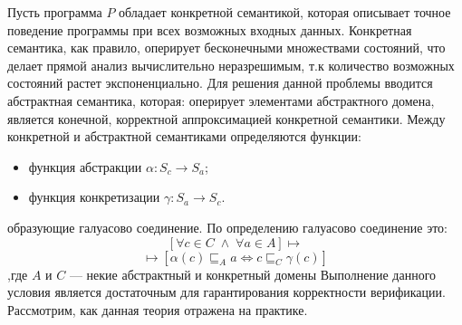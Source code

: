 Пусть программа $P$ обладает конкретной семантикой, которая описывает точное поведение программы при всех возможных 
входных данных. Конкретная семантика, как правило, оперирует бесконечными множествами состояний, что делает прямой анализ вычислительно неразрешимым, т.к 
количество возможных состояний растет экспоненциально. Для решения данной проблемы вводится абстрактная семантика, которая:
оперирует элементами абстрактного домена, является конечной, корректной аппроксимацией конкретной семантики.
Между конкретной и абстрактной семантиками определяются функции:
\begin{itemize}
    \item функция абстракции $\alpha : S_c \rightarrow S_a$;
    \item функция конкретизации $\gamma : S_a \rightarrow S_c$.
\end{itemize}
образующие галуасово соединение. По определению галуасово соединение это:
$$[\forall c\in C \;\land\; \forall a \in A] \longmapsto $$
$$ \longmapsto [\alpha(c) \sqsubseteq_A a \Longleftrightarrow c \sqsubseteq_C \gamma(c)] $$
,где $A$ и $C$ --- некие абстрактный и конкретный домены
Выполнение данного условия является достаточным для гарантирования корректности верификации. Рассмотрим, как данная теория 
отражена на практике. 

